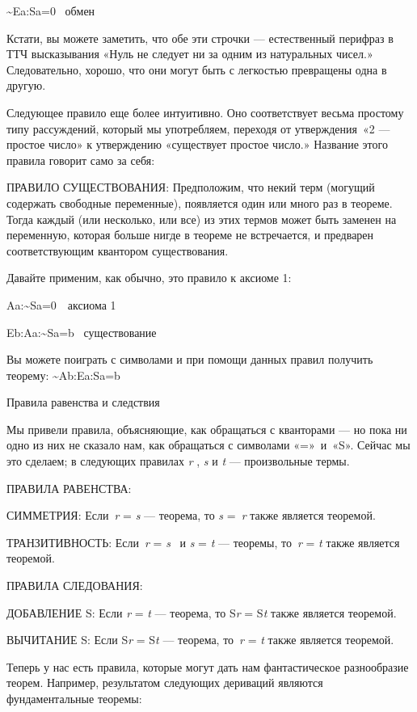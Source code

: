 \documentclass[../main.tex]{subfiles}
\begin{document}
\textasciitilde Ea:Sa=0~ обмен

Кстати, вы можете заметить, что обе эти строчки --- естественный перифраз в ТТЧ высказывания «Нуль не следует ни за одним из натуральных чисел.» Следовательно, хорошо, что они могут быть с легкостью превращены одна в другую.

Следующее правило еще более интуитивно. Оно соответствует весьма простому типу рассуждений, который мы употребляем, переходя от утверждения~«2 --- простое число» к утверждению «существует простое число.» Название этого правила говорит само за себя:

ПРАВИЛО СУЩЕСТВОВАНИЯ: Предположим, что некий терм (могущий содержать свободные переменные), появляется один или много раз в теореме. Тогда каждый (или несколько, или все) из этих термов может быть заменен на переменную, которая больше нигде в теореме не встречается, и предварен соответствующим квантором существования.

Давайте применим, как обычно, это правило к аксиоме 1:

Aa:\textasciitilde Sa=0~~аксиома 1~

Eb:Aa:\textasciitilde Sa=b ~существование

Вы можете поиграть с символами и при помощи данных правил получить теорему: \textasciitilde Ab:Ea:Sa=b

Правила равенства и следствия

Мы привели правила, объясняющие, как обращаться с кванторами --- но пока ни одно из них не сказало нам, как обращаться с символами «=»~и~«S». Сейчас мы это сделаем; в следующих правилах \emph{r} , \emph{s} и \emph{t} --- произвольные термы.

ПРАВИЛА РАВЕНСТВА:

СИММЕТРИЯ: Если~\emph{r} = \emph{s} --- теорема, то \emph{s} =~\emph{r} также является теоремой.

ТРАНЗИТИВНОСТЬ: Если~\emph{r} = \emph{s} ~и \emph{s} = \emph{t} --- теоремы, то~\emph{r} = \emph{t} также является теоремой.

ПРАВИЛА СЛЕДОВАНИЯ:

ДОБАВЛЕНИЕ S: Если \emph{r} = \emph{t} --- теорема, то S\emph{r} = S\emph{t} также является теоремой.

ВЫЧИТАНИЕ S: Если S\emph{r} = S\emph{t} --- теорема, то~\emph{r} = \emph{t} также является теоремой.

Теперь у нас есть правила, которые могут дать нам фантастическое разнообразие теорем. Например, результатом следующих дериваций являются фундаментальные теоремы:
\end{document}
